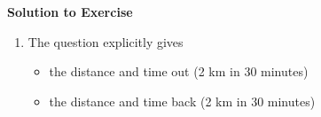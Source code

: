 {\begin{mdframed}[linewidth=4, leftmargin=40, rightmargin=40]
\begin{exercise}
      \vspace{5pt}
      \label{m38791*solfhsst!!!underscore!!!id691}\noindent\textbf{Solution to Exercise } \label{m38791*listfhsst!!!underscore!!!id691}\begin{enumerate}[noitemsep, label=\textbf{Step} \textbf{\arabic*}. ] 
            \leftskip=20pt\rightskip=\leftskip\item  
      \label{m38791*id64721}The question explicitly gives\par 
      \label{m38791*id64724}\begin{itemize}[noitemsep]
            \leftskip=20pt\rightskip=\leftskip\label{m38791*uid29}\item the distance and time out (2 km in 30 minutes)
\label{m38791*uid30}\item the distance and time back (2 km in 30 minutes)
\end{itemize}
        

\end{enumerate}
\end{exercise}
\end{mdframed}}
